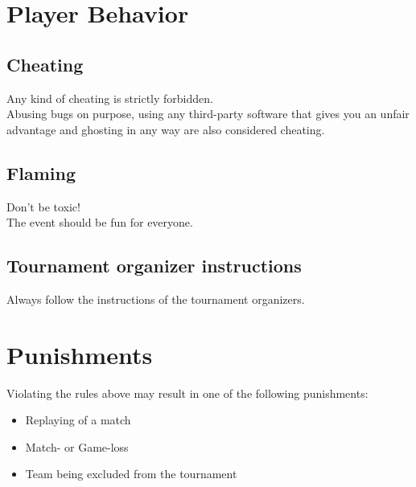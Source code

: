 \documentclass{article}
\begin{document}
\section{Player Behavior}
\subsection{Cheating}
Any kind of cheating is strictly forbidden.\\
Abusing bugs on purpose, using any third-party software that gives you an unfair advantage and ghosting in any way are also considered cheating.

\subsection{Flaming}
Don't be toxic!\\
The event should be fun for everyone.


\subsection{Tournament organizer instructions}
Always follow the instructions of the tournament organizers.


\section{Punishments}
Violating the rules above may result in one of the following punishments:
\begin{itemize}
	\item Replaying of a match
	\item Match- or Game-loss
	\item Team being excluded from the tournament
\end{itemize}
\end{document}
